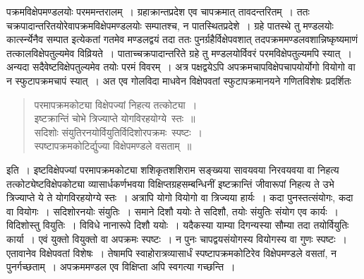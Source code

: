 \documentclass[11pt, openany]{book}
\begin{document}
\newpage

\noindent पक्रमविक्षेपमण्डलयोः परममन्तरालम्~। ग्रहाक्रान्तप्रदेश एव चापक्रमात् तावदन्तरितम्~। ततः चक्रपादान्तरितयोरेवापक्रमविक्षेपमण्डलयोः सम्पातश्च, न पातस्थितप्रदेशे~। ग्रहे पातस्थे तु मण्डलयोः कार्त्स्न्येनैव सम्पात इत्येकतां गतमेव मण्डलद्वयं तदा ततः पुनर्ग्रहैर्विक्षेपवशात् तदपक्रममण्डलवशान्निष्कृष्यमाणं तत्कालविक्षेपतुल्यमेव विव्रियते~। पाताच्चक्रपादान्तरिते ग्रहे तु मण्डलयोर्विवरं परमविक्षेपतुल्यमपि स्यात्~। अन्यदा सदैवेष्टविक्षेपतुल्यमेव तयोः परमं विवरम्~। अत्र पक्षद्वयेऽपि अपक्रमचापविक्षेपचापयोर्योगो वियोगो वा न स्फुटापक्रमचापं स्यात्~। अत एव गोलविदा माधवेन विक्षेपवतां स्फुटापक्रमानयने गणितविशेषः प्रदर्शितः\textendash  

\begin{quote}
{\qt परमापक्रमकोट्या विक्षेपज्यां निहत्य तत्कोट्या~।\\
 इष्टक्रान्तिं चोभे त्रिज्याप्ते योगविरहयोग्ये~स्तः~॥\\
सदिशोः संयुतिरनयोर्वियुतिर्विदिशोरपक्रमः~स्पष्टः~।\\
स्पष्टापक्रमकोटिर्द्युज्या विक्षेपमण्डले वसताम्~॥}
\end{quote}

\noindent इति~। इष्टविक्षेपज्यां परमापक्रमकोट्या {\qt शशिकृतशशिराम} सङ्ख्यया सावयवया निरवयवया वा निहत्य तत्कोट्येष्टविक्षेपकोट्या व्यासार्धकर्णभवया विक्षिप्तग्रहसम्बन्धिनीं इष्टक्रान्तिं जीवारूपां निहत्य ते उभे त्रिज्याप्ते ये ते योगविरहयोग्ये स्तः~। अत्रापि योगो वियोगो वा त्रिज्यया हार्यः~। कदा पुनस्तत्संयोगः, कदा वा वियोगः~। सदिशोरनयोः संयुतिः~। समाने दिशौ ययोः ते सदिशौ, तयोः संयुतिः संयोग एव कार्यः~। विदिशोस्तु वियुतिः~। विविधे नानारूपे दिशौ ययोः~। यदैकस्या याम्या दिगन्यस्या सौम्या तदा तयोर्वियुतिः कार्या~। एवं युक्तो वियुक्तो वा अपक्रमः स्पष्टः~। न पुनः चापद्वयसंयोगस्य वियोगस्य वा गुणः स्पष्टः~। एतावानेव विक्षेपवतां विशेषः~। तेषामपि स्वाहोरात्रव्यासार्धं स्पष्टापक्रमकोटिरेव विक्षेपमण्डले वसतां, न पुनर्गच्छताम्~। अपक्रममण्डल एव विक्षिप्ता अपि स्वगत्या गच्छन्ति~।

\newpage
\end{document}
